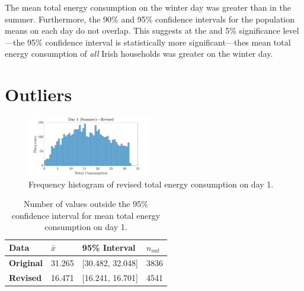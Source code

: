 \documentclass[a4paper,10pt]{article}
\begin{document}
The mean total energy consumption on the winter day was greater than in the 
summer. Furthermore, the 90\% and 95\% confidence intervals for the population 
means on each day do not overlap. This suggests at the and 5\% significance 
level---the 95\% confidence interval is statistically more significant---thes 
mean total energy consumption of \textit{all} Irish households was greater on 
the winter day.

\section{Outliers}

\begin{figure}[h]
    \centering
    \includegraphics[width=0.48\textwidth]{Day1Revised}
    \caption{Frequency histogram of revised total energy consumption on day 1.}
    \label{fig:NoOutliers}
\end{figure}

\begin{table}[h]
    \centering
    \begin{tabular}{llll}
        \toprule
        \textbf{Data} & $\bar{x}$ & 95\% Interval & $n_{out}$ \\
        \midrule
        \textbf{Original} & 31.265 & [30.482, 32.048] & 3836 \\
        \textbf{Revised}  & 16.471 & [16.241, 16.701] & 4541 \\
        \bottomrule
    \end{tabular}
    \caption{Number of values outside the 95\% confidence interval for mean 
    total energy consumption on day 1.}
    \label{table:Outliers}
\end{table}

\printbibliography

\clearpage
\end{document}
